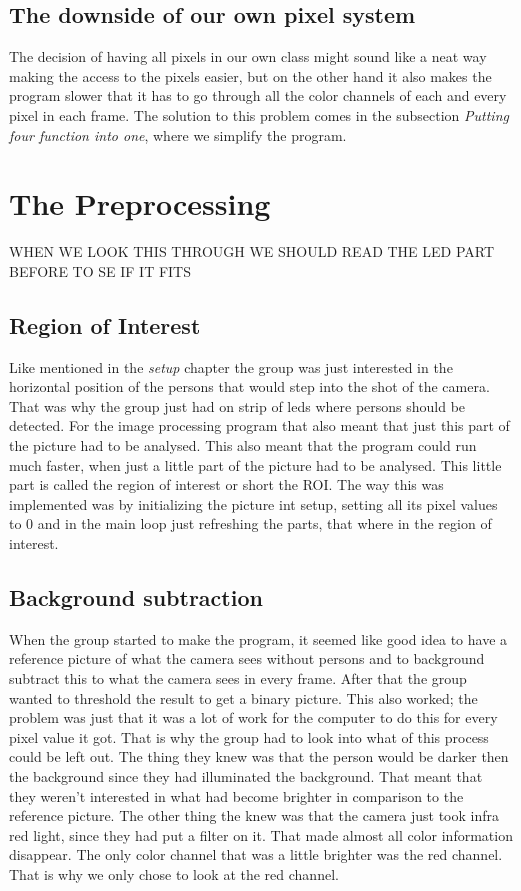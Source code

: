 \subsection{The downside of our own pixel system}

The decision of having all pixels in our own class might sound like a neat way making the access to the pixels easier, but on the other hand it also makes the program slower that it has to go through all the color channels of each and every pixel in each frame. The solution to this problem comes in the subsection \textit{Putting four function into one}, where we simplify the program. 

\section{The Preprocessing}
WHEN WE LOOK THIS THROUGH WE SHOULD READ THE LED PART BEFORE TO SE IF IT FITS
\subsection{Region of Interest}
Like mentioned in the \textit{setup} chapter the group was just interested in the horizontal position of the persons that would step into the shot of the camera. That was why the group just had on strip of leds where persons should be detected. For the image processing program that also meant that just this part of the picture had to be analysed. This also meant that the program could run much faster, when just a little part of the picture had to be analysed. This little part is called the region of interest or short the ROI. 
The way this was implemented was by initializing the picture int setup, setting all its pixel values to 0 and in the main loop just refreshing the parts, that where in the region of interest. 
\subsection{Background subtraction}
When the group started to make the program, it seemed like good idea to have a reference picture of what the camera sees without persons and to background subtract this to what the camera sees in every frame. After that the group wanted to threshold the result to get a binary picture. 
This also worked; the problem was just that it was a lot of work for the computer to do this for every pixel value it got. That is why the group had to look into what of this process could be left out. 
The thing they knew was that the person would be darker then the background since they had illuminated the background. That meant that they weren't interested in what had become brighter in comparison to the reference picture. The other thing the knew was that the camera just took infra red light, since they had put a filter on it. That made almost all color information disappear. The only color channel that was a little brighter was the red channel. That is why we only chose to look at the red channel. 

